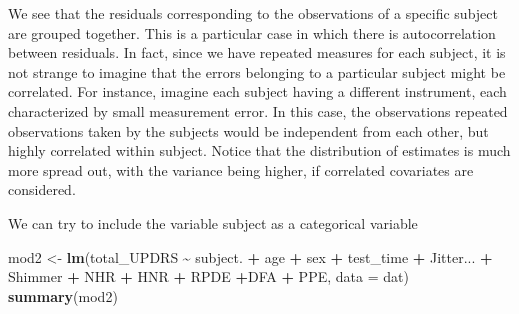 \documentclass[
]{article}
\newenvironment{Shaded}{\begin{snugshade}}{\end{snugshade}}
\newcommand{\AttributeTok}[1]{\textcolor[rgb]{0.13,0.29,0.53}{#1}}
\newcommand{\FunctionTok}[1]{\textcolor[rgb]{0.13,0.29,0.53}{\textbf{#1}}}
\newcommand{\NormalTok}[1]{#1}
\newcommand{\OtherTok}[1]{\textcolor[rgb]{0.56,0.35,0.01}{#1}}
\newcommand{\SpecialCharTok}[1]{\textcolor[rgb]{0.81,0.36,0.00}{\textbf{#1}}}
\begin{document}
We see that the residuals corresponding to the observations of a
specific subject are grouped together. This is a particular case in
which there is autocorrelation between residuals. In fact, since we have
repeated measures for each subject, it is not strange to imagine that
the errors belonging to a particular subject might be correlated. For
instance, imagine each subject having a different instrument, each
characterized by small measurement error. In this case, the observations
repeated observations taken by the subjects would be independent from
each other, but highly correlated within subject. Notice that the
distribution of estimates is much more spread out, with the variance
being higher, if correlated covariates are considered.

We can try to include the variable subject as a categorical variable

\begin{Shaded}
\begin{Highlighting}[]
\NormalTok{mod2 }\OtherTok{\textless{}{-}} \FunctionTok{lm}\NormalTok{(total\_UPDRS }\SpecialCharTok{\textasciitilde{}}\NormalTok{ subject. }\SpecialCharTok{+}\NormalTok{ age }\SpecialCharTok{+}\NormalTok{ sex }\SpecialCharTok{+}\NormalTok{ test\_time }\SpecialCharTok{+}
\NormalTok{             Jitter... }\SpecialCharTok{+}\NormalTok{ Shimmer }\SpecialCharTok{+}\NormalTok{ NHR }\SpecialCharTok{+}\NormalTok{ HNR }\SpecialCharTok{+}\NormalTok{ RPDE }\SpecialCharTok{+}\NormalTok{DFA }\SpecialCharTok{+}\NormalTok{ PPE,}
           \AttributeTok{data =}\NormalTok{ dat) }
\FunctionTok{summary}\NormalTok{(mod2)}
\end{Highlighting}
\end{Shaded}
\end{document}
